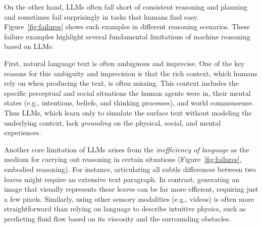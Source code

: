 \documentclass{article}
\newcommand{\hzt}[1]{{\color{red}{[ZT: #1]}}}
\begin{document}
On the other hand, LLMs often fall short of consistent reasoning and planning and sometimes fail surprisingly in tasks that humans find easy. Figure~\ref{fig:failures} shows such examples in different reasoning scenarios. These failure examples highlight several fundamental limitations of machine reasoning based on LLMs:

First, natural language text is often ambiguous and imprecise. One of the key reasons for this ambiguity and imprecision is that the rich context, which humans rely on when producing the text, is often missing. This context includes the specific perceptual and social situations the human agents were in, their mental states (e.g., intentions,  beliefs, and thinking processes), and world commonsense. Thus LLMs, which learn only to simulate the surface text without modeling the underlying context, lack {\it grounding} on the physical, social, and mental experiences. 

Another core limitation of LLMs arises from the {\it inefficiency of language} as the medium for carrying out reasoning in certain situations (Figure~\ref{fig:failures}, embodied reasoning). For instance, articulating all subtle differences between two leaves might require an extensive text paragraph. In contrast, generating an image that visually represents these leaves can be far more efficient, requiring just a few pixels. Similarly, using other sensory modalities (e.g., videos) is often more straightforward than relying on language to describe intuitive physics, such as predicting fluid flow based on its viscosity and the surrounding obstacles. 



\end{document}
